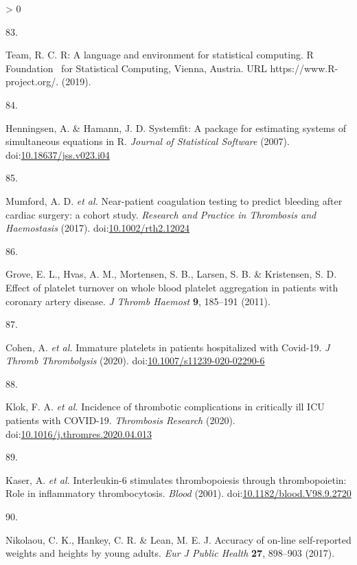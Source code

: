 \documentclass[11pt,twoside]{bristolthesis}
\newlength{\cslhangindent}
\newlength{\csllabelwidth}
\newenvironment{CSLReferences}[2] %
 {%
  \setlength{\parindent}{0pt}
  \ifodd #1 \everypar{\setlength{\hangindent}{\cslhangindent}}\ignorespaces\fi
  \ifnum #2 > 0
  \setlength{\parskip}{#2\baselineskip}
  \fi
 }%
 {}
\newcommand{\CSLLeftMargin}[1]{\parbox[t]{\csllabelwidth}{#1}}
\newcommand{\CSLRightInline}[1]{\parbox[t]{\linewidth - \csllabelwidth}{#1}\break}
\begin{document}
\begin{CSLReferences}{0}{0}
\leavevmode\hypertarget{ref-Team2019a}{}%
\CSLLeftMargin{83. }
\CSLRightInline{Team, R. C. {R: A language and environment for statistical computing. R Foundation~ for Statistical Computing, Vienna, Austria. URL https://www.R-project.org/.} (2019).}

\leavevmode\hypertarget{ref-Henningsen2007}{}%
\CSLLeftMargin{84. }
\CSLRightInline{Henningsen, A. \& Hamann, J. D. {Systemfit: A package for estimating systems of simultaneous equations in R}. \emph{Journal of Statistical Software} (2007). doi:\href{https://doi.org/10.18637/jss.v023.i04}{10.18637/jss.v023.i04}}

\leavevmode\hypertarget{ref-Mumford2017}{}%
\CSLLeftMargin{85. }
\CSLRightInline{Mumford, A. D. \emph{et al.} {Near-patient coagulation testing to predict bleeding after cardiac surgery: a cohort study}. \emph{Research and Practice in Thrombosis and Haemostasis} (2017). doi:\href{https://doi.org/10.1002/rth2.12024}{10.1002/rth2.12024}}

\leavevmode\hypertarget{ref-Grove2011a}{}%
\CSLLeftMargin{86. }
\CSLRightInline{Grove, E. L., Hvas, A. M., Mortensen, S. B., Larsen, S. B. \& Kristensen, S. D. {Effect of platelet turnover on whole blood platelet aggregation in patients with coronary artery disease}. \emph{J Thromb Haemost} \textbf{9}, 185--191 (2011).}

\leavevmode\hypertarget{ref-Cohen2020}{}%
\CSLLeftMargin{87. }
\CSLRightInline{Cohen, A. \emph{et al.} {Immature platelets in patients hospitalized with Covid-19}. \emph{J Thromb Thrombolysis} (2020). doi:\href{https://doi.org/10.1007/s11239-020-02290-6}{10.1007/s11239-020-02290-6}}

\leavevmode\hypertarget{ref-Klok2020}{}%
\CSLLeftMargin{88. }
\CSLRightInline{Klok, F. A. \emph{et al.} {Incidence of thrombotic complications in critically ill ICU patients with COVID-19}. \emph{Thrombosis Research} (2020). doi:\href{https://doi.org/10.1016/j.thromres.2020.04.013}{10.1016/j.thromres.2020.04.013}}

\leavevmode\hypertarget{ref-Kaser2001}{}%
\CSLLeftMargin{89. }
\CSLRightInline{Kaser, A. \emph{et al.} {Interleukin-6 stimulates thrombopoiesis through thrombopoietin: Role in inflammatory thrombocytosis}. \emph{Blood} (2001). doi:\href{https://doi.org/10.1182/blood.V98.9.2720}{10.1182/blood.V98.9.2720}}

\leavevmode\hypertarget{ref-Nikolaou2017}{}%
\CSLLeftMargin{90. }
\CSLRightInline{Nikolaou, C. K., Hankey, C. R. \& Lean, M. E. J. {Accuracy of on-line self-reported weights and heights by young adults}. \emph{Eur J Public Health} \textbf{27}, 898--903 (2017).}


\end{CSLReferences}
\end{document}
